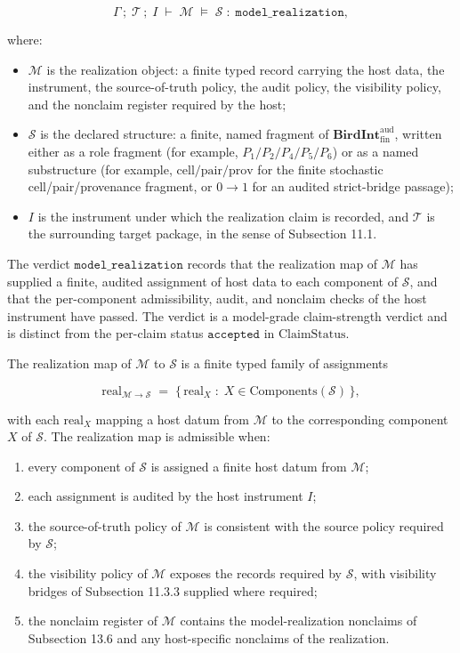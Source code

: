 \documentclass[11pt]{article}
\providecommand{\tightlist}{}
\theoremstyle{definition}
\begin{document}
\[
\Gamma\,;\;\mathcal T\,;\;I\;\vdash\;\mathcal M\;\models\;\mathcal S\;:\;\texttt{model\_realization},
\]

where:

\begin{itemize}
\tightlist
\item
  \(\mathcal M\) is the realization object: a finite typed record carrying the host data, the instrument, the source-of-truth policy, the audit policy, the visibility policy, and the nonclaim register required by the host;
\item
  \(\mathcal S\) is the declared structure: a finite, named fragment of \(\mathbf{BirdInt}^{\mathrm{aud}}_{\mathrm{fin}}\), written either as a role fragment (for example, \(P_1/P_2/P_4/P_5/P_6\)) or as a named substructure (for example, \(\mathrm{cell/pair/prov}\) for the finite stochastic cell/pair/provenance fragment, or \(0\to1\) for an audited strict-bridge passage);
\item
  \(I\) is the instrument under which the realization claim is recorded, and \(\mathcal T\) is the surrounding target package, in the sense of Subsection 11.1.
\end{itemize}

The verdict \(\texttt{model\_realization}\) records that the realization map of \(\mathcal M\) has supplied a finite, audited assignment of host data to each component of \(\mathcal S\), and that the per-component admissibility, audit, and nonclaim checks of the host instrument have passed. The verdict is a model-grade claim-strength verdict and is distinct from the per-claim status \(\texttt{accepted}\) in \(\mathrm{ClaimStatus}\).

The realization map of \(\mathcal M\) to \(\mathcal S\) is a finite typed family of assignments

\[
\mathrm{real}_{\mathcal M\to\mathcal S}\;=\;\bigl\{\,\mathrm{real}_X\;:\;X\in\mathrm{Components}(\mathcal S)\,\bigr\},
\]

with each \(\mathrm{real}_X\) mapping a host datum from \(\mathcal M\) to the corresponding component \(X\) of \(\mathcal S\). The realization map is admissible when:

\begin{enumerate}
\def\labelenumi{\arabic{enumi}.}
\tightlist
\item
  every component of \(\mathcal S\) is assigned a finite host datum from \(\mathcal M\);
\item
  each assignment is audited by the host instrument \(I\);
\item
  the source-of-truth policy of \(\mathcal M\) is consistent with the source policy required by \(\mathcal S\);
\item
  the visibility policy of \(\mathcal M\) exposes the records required by \(\mathcal S\), with visibility bridges of Subsection 11.3.3 supplied where required;
\item
  the nonclaim register of \(\mathcal M\) contains the model-realization nonclaims of Subsection 13.6 and any host-specific nonclaims of the realization.
\end{enumerate}
\end{document}
